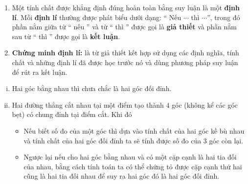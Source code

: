 \begin{enumerate}[\tickEX]
\item Một tính chất được khẳng định đúng hoàn toàn bằng suy luận là một {\bf định lí}. Mỗi {\bf định lí} thường được phát biểu dưới dạng: `` Nếu $\cdots$ thì $\cdots$'', trong đó phần nằm giữa từ `` nếu '' và từ `` thì '' được gọi là {\bf giả thiết} và phần nằm sau từ `` thì '' được gọi là {\bf kết luận}.
\item {\bf Chứng minh định lí:} là từ giả thiết kết hợp sử dụng các định nghĩa, tính chất và những định lí đã được học trước nó và dùng phương pháp suy luận để rút ra kết luận.
	\end{enumerate}
	\begin{note}
		\begin{enumerate}[(i)]
			\item Hai góc bằng nhau thì chưa chắc là hai góc đối đỉnh.
			\item Hai đường thẳng cắt nhau tại một điểm tạo thành $4$ góc (không kể các góc bẹt) có chung đỉnh tại điểm cắt. Khi đó
				\begin{itemize}
					\item Nếu biết số đo của một góc thì dựa vào tính chất của hai góc kề bù nhau và tính chất của hai góc đối đỉnh ta sẽ tính được số đo của $3$ góc còn lại.
					\item Ngược lại nếu cho hai góc bằng nhau và có một cặp cạnh là hai tia đối của nhau, bằng cách tính toán ta có thể chứng tỏ được cặp cạnh thứ hai cũng là hai tia đối nhau để suy ra hai góc đó là hai góc đối đỉnh.
				\end{itemize}
		\end{enumerate}
	\end{note}
